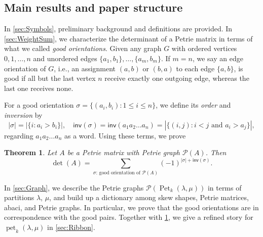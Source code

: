 \documentclass[pdflatex,sn-mathphys-num]{sn-jnl}%
\theoremstyle{thmstyleone}%
\newtheorem{theorem}{Theorem}[section]
\theoremstyle{thmstyletwo}%
\theoremstyle{thmstylethree}%
\numberwithin{equation}{section}
\DeclareMathOperator{\pet}{pet}
\DeclareMathOperator{\Pet}{Pet}
\begin{document}
\subsection{Main results and paper structure}

\medskip
In \cref{sec:Symbols}, preliminary background and definitions are provided.  
In \cref{sec:WeightSum}, we characterize the determinant of a Petrie matrix in terms of what we called \textit{good orientations}. Given any graph $G$ with ordered vertices $0,1,\dotsc,n$ and unordered edges $\{a_1,b_1\},\dotsc,\{a_m,b_m\}$. If $m=n$, we say an edge orientation of $G$, i.e., an assignment $(a,b)$ or $(b,a)$ to each edge $\{a,b\}$, is good if all but the last vertex $n$ receive exactly one outgoing edge, whereas the last one receives none.

For a good orientation $\sigma=\{(a_i,b_i): 1\leq i\leq n\}$, we define its \emph{order} and \emph{inversion} by
\[
|\sigma| = |\{ i : a_i > b_i \}|, \quad 
\mathsf{inv}(\sigma) = \mathsf{inv}(a_1 a_2 \dots a_n) = |\{ (i, j) : i < j \text{ and } a_i > a_j \}|,
\]
regarding $a_1 a_2 \dots a_n$ as a word. Using these terms, we prove

\begin{theorem}\label{thm:detPet_goodOrientation}
Let $A$ be a Petrie matrix with Petrie graph $\mathcal{P}(A)$. Then
\[
\det(A) = \sum_{\sigma:\,\text{good orientation of $\mathcal{P}(A)$}} (-1)^{|\sigma| + \mathsf{inv}(\sigma)}.
\]
\end{theorem}

\medskip
In \cref{sec:Graph}, we describe the Petrie graphs $\mathcal{P}(\Pet_k(\lambda,\mu))$ in terms of partitions $\lambda$, $\mu$, and build up a dictionary among skew shapes, Petrie matrices, abaci, and Petrie graphs. In particular, we prove that the good orientations are in correspondence with the good pairs. Together with \cref{thm:detPet_goodOrientation}, we give a refined story for $\pet_k(\lambda,\mu)$ in \cref{sec:Ribbon}.
\end{document}
